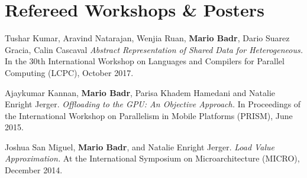 \section{\sc Refereed Workshops \& Posters}

{
  Tushar Kumar, Aravind Natarajan, Wenjia Ruan, \textbf{Mario Badr}, Dario Suarez Gracia, Calin Cascaval
  \textit{Abstract Representation of Shared Data for Heterogeneous.}
  In the 30th International Workshop on Languages and Compilers for Parallel Computing (LCPC), October 2017.
}

{
  Ajaykumar Kannan, \textbf{Mario Badr}, Parisa Khadem Hamedani and Natalie Enright Jerger.
  \textit{Offloading to the GPU: An Objective Approach.}
  In Proceedings of the International Workshop on Parallelism in Mobile Platforms (PRISM), June 2015.
}

{
  Joshua San Miguel, \textbf{Mario Badr}, and Natalie Enright Jerger.
  \textit{Load Value Approximation.}
  At the International Symposium on Microarchitecture (MICRO), December 2014.
}
